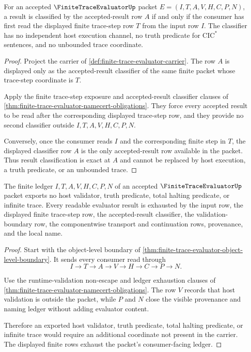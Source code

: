 \begin{theorem}
\label{thm:finite-trace-evaluator-result-classifier-exactness}
For an accepted $\FiniteTraceEvaluatorUp$ packet
$E=(I,T,A,V,H,C,P,N)$, a result is classified by the accepted-result row $A$
if and only if the consumer has first read the displayed finite trace-step row
$T$ from the input row $I$. The classifier has no independent host execution
channel, no truth predicate for $\mathrm{CIC}^{*}$ sentences, and no
unbounded trace coordinate.
\end{theorem}
\begin{proof}
Project the carrier of \autoref{def:finite-trace-evaluator-carrier}. The row
$A$ is displayed only as the accepted-result classifier of the same finite
packet whose trace-step coordinate is $T$.

Apply the finite trace-step exposure and accepted-result classifier clauses of
\autoref{thm:finite-trace-evaluator-namecert-obligations}. They force every
accepted result to be read after the corresponding displayed trace-step row,
and they provide no second classifier outside $I,T,A,V,H,C,P,N$.

Conversely, once the consumer reads $I$ and the corresponding finite step in
$T$, the displayed classifier row $A$ is the only accepted-result row available
in the packet. Thus result classification is exact at $A$ and cannot be
replaced by host execution, a truth predicate, or an unbounded trace.
\end{proof}

\begin{theorem}
\label{thm:finite-trace-evaluator-ledger-nonescape}
The finite ledger $I,T,A,V,H,C,P,N$ of an accepted
$\FiniteTraceEvaluatorUp$ packet exports no host validator, truth predicate,
total halting predicate, or infinite trace. Every readable evaluator result is
exhausted by the input row, the displayed finite trace-step row, the
accepted-result classifier, the validation-boundary row, the componentwise
transport and continuation rows, provenance, and the local name.
\end{theorem}
\begin{proof}
Start with the object-level boundary of
\autoref{thm:finite-trace-evaluator-object-level-boundary}. It sends every
consumer read through
$$
I \to T \to A \to V \to H \to C \to P \to N.
$$

Use the runtime-validation non-escape and ledger exhaustion clauses of
\autoref{thm:finite-trace-evaluator-namecert-obligations}. The row $V$ records
that host validation is outside the packet, while $P$ and $N$ close the
visible provenance and naming ledger without adding evaluator content.

Therefore an exported host validator, truth predicate, total halting
predicate, or infinite trace would require an additional coordinate not
present in the carrier. The displayed finite rows exhaust the packet's
consumer-facing ledger.
\end{proof}

